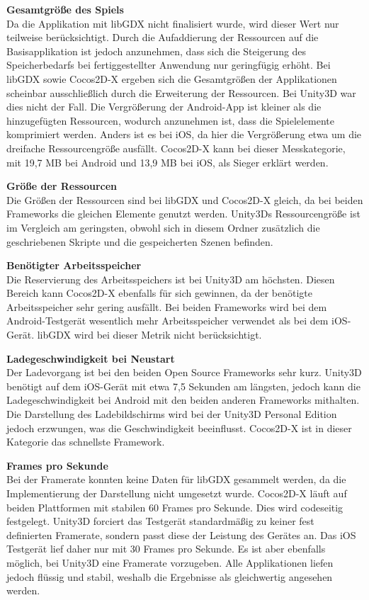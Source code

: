 \bigskip
\textbf{Gesamtgröße des Spiels} \\
Da die Applikation mit libGDX nicht finalisiert wurde, wird dieser Wert nur teilweise berücksichtigt. Durch die Aufaddierung der Ressourcen auf die Basisapplikation ist jedoch anzunehmen, dass sich die Steigerung des Speicherbedarfs bei fertiggestellter Anwendung nur geringfügig erhöht. Bei libGDX sowie Cocos2D-X ergeben sich die Gesamtgrößen der Applikationen scheinbar ausschließlich durch die Erweiterung der Ressourcen. Bei Unity3D war dies nicht der Fall. Die Vergrößerung der Android-App ist kleiner als die hinzugefügten Ressourcen, wodurch anzunehmen ist, dass die Spielelemente komprimiert werden. Anders ist es bei iOS, da hier die Vergrößerung etwa um die dreifache Ressourcengröße ausfällt. Cocos2D-X kann bei dieser Messkategorie, mit 19,7 MB bei Android und 13,9 MB bei iOS, als Sieger erklärt werden.


\bigskip
\textbf{Größe der Ressourcen} \\
Die Größen der Ressourcen sind bei libGDX und Cocos2D-X gleich, da bei beiden Frameworks die gleichen Elemente genutzt werden. Unity3Ds Ressourcengröße ist im Vergleich am geringsten, obwohl sich in diesem Ordner zusätzlich die geschriebenen Skripte und die gespeicherten Szenen befinden.

\bigskip
\textbf{Benötigter Arbeitsspeicher} \\
Die Reservierung des Arbeitsspeichers ist bei Unity3D am höchsten. Diesen Bereich kann Cocos2D-X ebenfalls für sich gewinnen, da der benötigte Arbeitsspeicher sehr gering ausfällt. Bei beiden Frameworks wird bei dem Android-Testgerät wesentlich mehr Arbeitsspeicher verwendet als bei dem iOS-Gerät. libGDX wird bei dieser Metrik nicht berücksichtigt. 


\bigskip
\textbf{Ladegeschwindigkeit bei Neustart} \\
Der Ladevorgang ist bei den beiden Open Source Frameworks sehr kurz. Unity3D benötigt auf dem iOS-Gerät mit etwa 7,5 Sekunden am längsten, jedoch kann die Ladegeschwindigkeit bei Android mit den beiden anderen Frameworks mithalten. Die Darstellung des Ladebildschirms wird bei der Unity3D Personal Edition jedoch erzwungen, was die Geschwindigkeit beeinflusst. Cocos2D-X ist in dieser Kategorie das schnellste Framework.


\bigskip
\textbf{Frames pro Sekunde} \\
Bei der Framerate konnten keine Daten für libGDX gesammelt werden, da die Implementierung der Darstellung nicht umgesetzt wurde. Cocos2D-X läuft auf beiden Plattformen mit stabilen 60 Frames pro Sekunde. Dies wird codeseitig festgelegt. Unity3D forciert das Testgerät standardmäßig zu keiner fest definierten Framerate, sondern passt diese der Leistung des Gerätes an. Das iOS Testgerät lief daher nur mit 30 Frames pro Sekunde. Es ist aber ebenfalls möglich, bei Unity3D eine Framerate vorzugeben. Alle Applikationen liefen jedoch flüssig und stabil, weshalb die Ergebnisse als gleichwertig angesehen werden.

